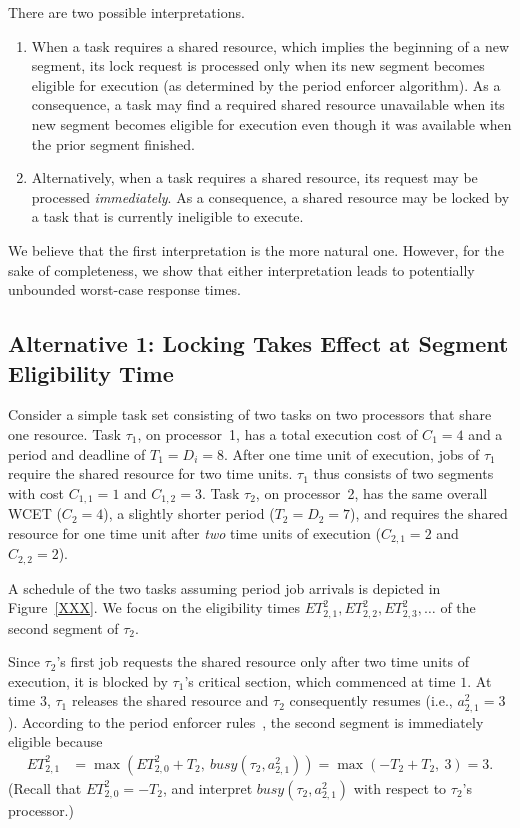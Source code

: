 There are two possible interpretations.
\begin{enumerate}
	\item When a task requires a shared resource, which implies the beginning of a new segment, its lock request is processed only when its new segment becomes eligible for execution (as determined by the period enforcer algorithm). As a consequence, a task may find a required shared resource unavailable when its new segment becomes eligible for execution even though it was available when the prior segment finished.
	\item Alternatively, when a task requires a shared resource, its request may be processed \emph{immediately}. As a consequence, a shared resource may be locked by a task that is currently ineligible to execute.
\end{enumerate}
We believe that the first interpretation is the more natural one. However, for the sake of completeness, we show that either interpretation leads to potentially unbounded worst-case response times.

\subsection{Alternative 1: Locking Takes Effect at Segment Eligibility Time}
Consider a simple task set consisting of two tasks on two processors that share one resource. Task $\tau_1$, on processor~1, has a total execution cost of $C_1 = 4$ and a period and deadline of $T_1 = D_i = 8$. After one time unit of execution, jobs of $\tau_1$ require the shared resource for two time units. $\tau_1$ thus consists of two segments with cost $C_{1,1} = 1$ and $C_{1,2} = 3$. Task $\tau_2$, on processor~2, has the same overall WCET ($C_2 = 4$), a slightly shorter period ($T_2 = D_2 = 7$), and requires the shared resource for one time unit after \emph{two} time units of execution ($C_{2,1} = 2$ and $C_{2,2} = 2$).

A schedule of the two tasks assuming period job arrivals is depicted in Figure~\ref{XXX}. We focus on the eligibility times $ET_{2,1}^2,ET_{2,2}^2,ET_{2,3}^2,\ldots$ of the second segment of $\tau_2$.

Since $\tau_2$'s first job requests the shared resource only after two time units of execution, it is blocked by $\tau_1$'s critical section, which commenced at time $1$. At time $3$, $\tau_1$ releases the shared resource and $\tau_2$ consequently resumes (i.e., $a^2_{2,1} = 3$). According to the period enforcer rules~\cite{Raj:suspension1991}, the second segment is immediately eligible because
\begin{align*}
	ET_{2,1}^2 & = \max\left(ET_{2,0}^2 + T_2,\ \mathit{busy}(\tau_2, a^2_{2,1})\right) =\max(-T_2 + T_2,\ 3) = 3.
\end{align*}
(Recall that $ET_{2,0}^2 = -T_2$, and interpret $\mathit{busy}(\tau_2, a^2_{2,1})$ with respect to $\tau_2$'s processor.)


